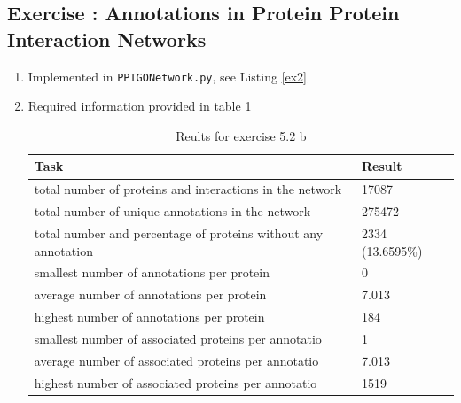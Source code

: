 \documentclass[10pt,a4paper]{article}
\newcommand{\exercise}[1]
{
  \stepcounter{subsection}
  \subsection*{Exercise \thesubsection: #1}

}
\begin{document}
\exercise{Annotations in Protein Protein Interaction Networks}
\begin{enumerate}
\item Implemented in \texttt{PPIGONetwork.py}, see Listing \ref{ex2}

\item Required information provided in table \ref{table:ex2a}
\begin{table}[!h]
\caption{Reults for exercise 5.2 b}
\label{table:ex2a}
\begin{tabular}{l l}
Task & Result\\
\hline
total number of proteins and interactions in the network & 17087\\
total number of unique annotations in the network & 275472\\
total number and percentage of proteins without any annotation & 2334 (13.6595\%)\\
smallest number of annotations per protein & 0\\
average number of annotations per protein & 7.013\\
highest number of annotations per protein & 184\\
smallest number of associated proteins per annotatio & 1\\
average number of associated proteins per annotatio & 7.013\\
highest number of associated proteins per annotatio & 1519\\
\end{tabular}
\end{table}


\end{enumerate}
\end{document}
